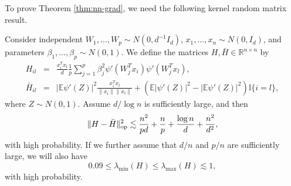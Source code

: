 To prove Theorem \ref{thm:nn-grad}, we need the following kernel random matrix result.
\begin{lemma}\label{lem:lim-H}
Consider independent $W_1,\ldots,W_p\sim N(0,d^{-1}I_d)$, $x_1,\ldots,x_n\sim N(0,I_d)$, and parameters $\beta_1,\ldots,\beta_p\sim N(0,1)$. We define the matrices $H, \bar{H}\in\mathbb{R}^{n\times n}$ by
\begin{eqnarray*}
H_{il} &=& \frac{x_i^Tx_l}{d}\frac{1}{p}\sum_{j=1}^p\beta_j^2\psi'(W^T_jx_i)\psi'(W_j^Tx_l), \\
\bar{H}_{il} &=& |\mathbb{E}\psi'(Z)|^2\frac{x_i^Tx_l}{\|x_i\|\|x_l\|} + \left(\mathbb{E}|\psi'(Z)|^2-|\mathbb{E}\psi'(Z)|^2\right)\mathbb{I}\{i=l\},
\end{eqnarray*}
where $Z\sim N(0,1)$.
Assume $d/\log n$ is sufficiently large, and then
$$\|H-\bar{H}\|_{\rm op}^2 \lesssim \frac{n^2}{pd} + \frac{n}{p} + \frac{\log n}{d} + \frac{n^2}{d^2},$$
with high probability. If we further assume that $d/n$ and $p/n$ are sufficiently large, we will also have
\begin{equation}
0.09\leq\lambda_{\min}(H)\leq \lambda_{\max}(H)\lesssim 1, \label{eq:spectrum-H-bound}
\end{equation}
with high probability.
\end{lemma}

